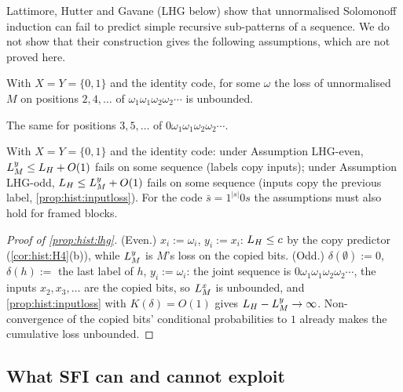 Lattimore, Hutter and Gavane (LHG below) \citep{lattimore2011universal} show that unnormalised Solomonoff induction can fail to predict simple recursive sub-patterns of a sequence. We do not show that their construction gives the following assumptions, which are not proved here.

\begin{assumption}\label{ass:hist:lhgeven}
With $X=Y=\{0,1\}$ and the identity code, for some $\omega$ the loss of unnormalised $M$ on positions $2,4,\dots$ of $\omega_1\omega_1\omega_2\omega_2\cdots$ is unbounded.
\end{assumption}

\begin{assumption}\label{ass:hist:lhgodd}
The same for positions $3,5,\dots$ of $0\omega_1\omega_1\omega_2\omega_2\cdots$.
\end{assumption}

\begin{proposition}\label{prop:hist:lhg}
With $X=Y=\{0,1\}$ and the identity code: under Assumption LHG-even, $L_{M}^{y}\le L_{H}+O(1)$ fails on some sequence (labels copy inputs); under Assumption LHG-odd, $L_{H}\le L_{M}^{y}+O(1)$ fails on some sequence (inputs copy the previous label, \cref{prop:hist:inputloss}). For the code $\bar s=1^{|s|}0s$ the assumptions must also hold for framed blocks.
\end{proposition}

\begin{proof}[Proof of \cref{prop:hist:lhg}]
(Even.) $x_i:=\omega_i$, $y_i:=x_i$: $L_{H}\le c$ by the copy predictor (\cref{cor:hist:H4}(b)), while $L_{M}^{y}$ is $M$'s loss on the copied bits. (Odd.) $\delta(\emptyset):=0$, $\delta(h):=$ the last label of $h$, $y_i:=\omega_i$: the joint sequence is $0\omega_1\omega_1\omega_2\omega_2\cdots$, the inputs $x_2,x_3,\dots$ are the copied bits, so $L_{M}^{x}$ is unbounded, and \cref{prop:hist:inputloss} with $K(\delta)=O(1)$ gives $L_{H}-L_{M}^{y}\to\infty$. Non-convergence of the copied bits' conditional probabilities to $1$ already makes the cumulative loss unbounded.
\end{proof}

\subsection{What SFI can and cannot exploit}\label{app:hist:exploit}

